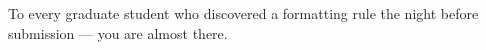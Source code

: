To every graduate student who discovered a formatting rule the night
before submission --- you are almost there.
